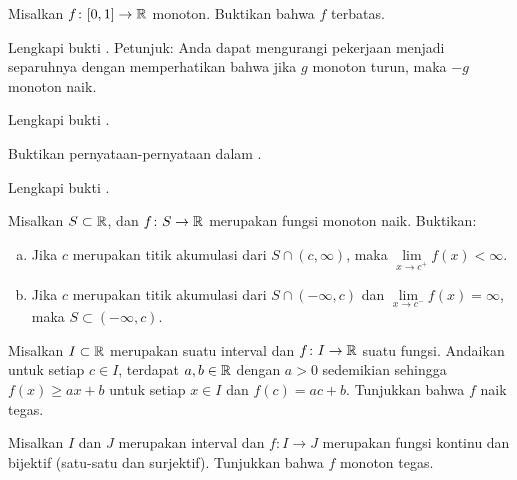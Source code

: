 \begin{exercise}
Misalkan $f \colon [0,1] \to {\mathbb{R}}$ monoton.  Buktikan bahwa $f$ terbatas.
\end{exercise}

\begin{exercise}
Lengkapi bukti .
Petunjuk: Anda dapat mengurangi pekerjaan menjadi separuhnya dengan memperhatikan bahwa jika $g$ monoton turun,
maka $-g$ monoton naik.
\end{exercise}

\begin{exercise}
Lengkapi bukti .
\end{exercise}

\begin{exercise}
Buktikan pernyataan-pernyataan dalam .
\end{exercise}

\begin{exercise}
Lengkapi bukti .
\end{exercise}

\begin{samepage}
\begin{exercise}
Misalkan $S \subset {\mathbb{R}}$, dan $f \colon S \to {\mathbb{R}}$ merupakan fungsi
monoton naik.  Buktikan:
\begin{enumerate}[a)]
\item
Jika $c$ merupakan titik akumulasi
dari $S \cap (c,\infty)$, maka
$\lim\limits_{x\to c^+} f(x) < \infty$.
\item
Jika $c$ merupakan titik akumulasi dari $S \cap (-\infty,c)$
dan $\lim\limits_{x\to c^-} f(x) = \infty$, maka
$S \subset (-\infty,c)$.
\end{enumerate}
\end{exercise}
\end{samepage}

\begin{exercise}
Misalkan $I \subset {\mathbb{R}}$ merupakan suatu interval dan $f \colon I \to {\mathbb{R}}$ suatu fungsi.
Andaikan untuk setiap $c \in I$, terdapat $a, b \in {\mathbb{R}}$ dengan
$a > 0$ sedemikian sehingga $f(x) \geq a x + b$ untuk setiap $x \in I$
dan $f(c) = a c + b$.  Tunjukkan bahwa $f$ naik tegas.
\end{exercise}

\begin{exercise}
Misalkan $I$ dan $J$ merupakan interval dan
$f \colon I \to J$ merupakan fungsi kontinu dan bijektif (satu-satu dan surjektif).
Tunjukkan bahwa $f$ monoton tegas.
\end{exercise}

